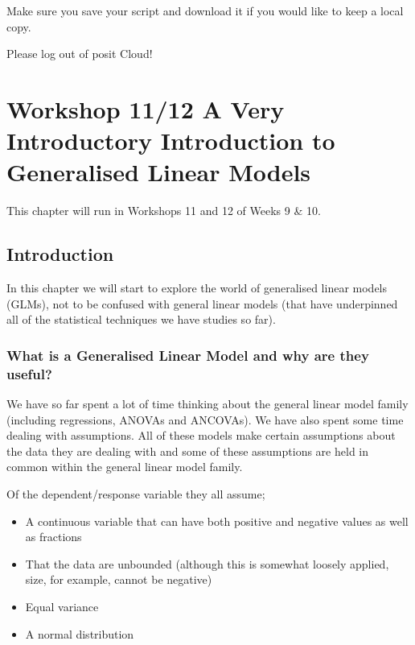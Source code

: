 \documentclass[
]{book}
\providecommand{\tightlist}{%
  \setlength{\itemsep}{0pt}\setlength{\parskip}{0pt}}
\begin{document}
Make sure you save your script and download it if you would like to keep a local copy.

Please log out of posit Cloud!

\chapter{Workshop 11/12 A Very Introductory Introduction to Generalised Linear Models}\label{workshop-1112-a-very-introductory-introduction-to-generalised-linear-models}

This chapter will run in Workshops 11 and 12 of Weeks 9 \& 10.

\section{Introduction}\label{introduction-9}

In this chapter we will start to explore the world of generalised linear models (GLMs), not to be confused with general linear models (that have underpinned all of the statistical techniques we have studies so far).

\subsection{What is a Generalised Linear Model and why are they useful?}\label{what-is-a-generalised-linear-model-and-why-are-they-useful}

We have so far spent a lot of time thinking about the general linear model family (including regressions, ANOVAs and ANCOVAs). We have also spent some time dealing with assumptions. All of these models make certain assumptions about the data they are dealing with and some of these assumptions are held in common within the general linear model family.

Of the dependent/response variable they all assume;

\begin{itemize}
\tightlist
\item
  A continuous variable that can have both positive and negative values as well as fractions
\item
  That the data are unbounded (although this is somewhat loosely applied, size, for example, cannot be negative)
\item
  Equal variance\\
\item
  A normal distribution
\end{itemize}
\end{document}
